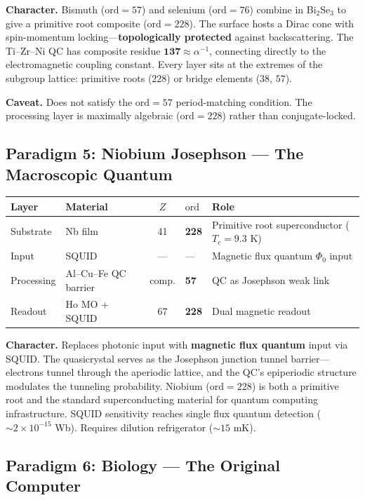 \noindent \textbf{Character.} Bismuth ($\mathrm{ord} = 57$) and selenium ($\mathrm{ord} = 76$) combine in Bi$_2$Se$_3$ to give a primitive root composite ($\mathrm{ord} = 228$). The surface hosts a Dirac cone with spin-momentum locking---\textbf{topologically protected} against backscattering. The Ti--Zr--Ni QC has composite residue $\mathbf{137} \approx \alpha^{-1}$, connecting directly to the electromagnetic coupling constant. Every layer sits at the extremes of the subgroup lattice: primitive roots ($228$) or bridge elements ($38$, $57$).

\textbf{Caveat.} Does not satisfy the $\mathrm{ord} = 57$ period-matching condition. The processing layer is maximally algebraic ($\mathrm{ord} = 228$) rather than conjugate-locked.

\subsection{Paradigm 5: Niobium Josephson --- The Macroscopic Quantum}

\begin{center}
\begin{tabular}{@{}llcll@{}}
\toprule
\textbf{Layer} & \textbf{Material} & $Z$ & $\mathrm{ord}$ & \textbf{Role} \\
\midrule
Substrate & Nb film & 41 & \textbf{228} & Primitive root superconductor ($T_c = 9.3$ K) \\
Input & SQUID & --- & --- & Magnetic flux quantum $\Phi_0$ input \\
Processing & Al--Cu--Fe QC barrier & comp. & \textbf{57} & QC as Josephson weak link \\
Readout & Ho MO + SQUID & 67 & \textbf{228} & Dual magnetic readout \\
\bottomrule
\end{tabular}
\end{center}

\noindent \textbf{Character.} Replaces photonic input with \textbf{magnetic flux quantum} input via SQUID. The quasicrystal serves as the Josephson junction tunnel barrier---electrons tunnel through the aperiodic lattice, and the QC's epiperiodic structure modulates the tunneling probability. Niobium ($\mathrm{ord} = 228$) is both a primitive root and the standard superconducting material for quantum computing infrastructure. SQUID sensitivity reaches single flux quantum detection (${\sim}2 \times 10^{-15}$ Wb). Requires dilution refrigerator (${\sim}15$ mK).

\subsection{Paradigm 6: Biology --- The Original Computer}

